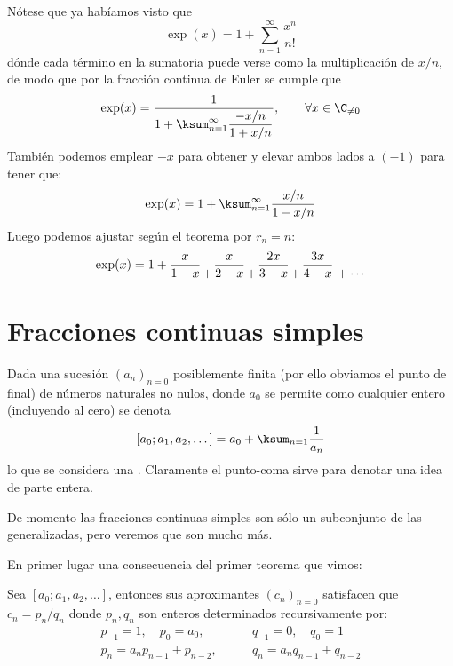 \documentclass[teoria-numeros.tex]{subfiles}
\begin{document}
\begin{ex}[ $\displaystyle \exp(x) = \frac{1}{1} {\atop +} \frac{-x/1}{1 + x/1} {\atop +} \frac{-x/2}{1 + x/2} {\atop +} \frac{-x/3}{1 + x/3} {\atop {}+\cdots} $ ]
	Nótese que ya habíamos visto que
	$$ \exp(x) = 1 + \sum_{n=1}^\infty \frac{x^n}{n!} $$
	dónde cada término en la sumatoria puede verse como la multiplicación de $x/n$, de modo que por la fracción continua de Euler se cumple que
	$$ \exp(x) = \frac{1}{ \displaystyle 1 + \ksum_{n=1}^\infty \frac{-x/n}{1 + x/n} }, \qquad \forall x\in\C_{\ne 0} $$
	También podemos emplear $-x$ para obtener y elevar ambos lados a $(-1)$ para tener que:
	$$ \exp(x) = 1 + \ksum_{n=1}^\infty \frac{x/n}{1 - x/n} $$
	Luego podemos ajustar según el teorema por $r_n = n$:
	$$ \exp(x) = 1 + \frac{x}{1 - x} {\atop +} \frac{x}{2 - x} {\atop +} \frac{2x}{3 - x} {\atop +} \frac{3x}{4 - x} {\atop {}+\cdots} $$
\end{ex}

\section{Fracciones continuas simples}
\begin{mydefi}
	Dada una sucesión $(a_n)_{n=0}$ posiblemente finita (por ello obviamos el punto de final) de números naturales no nulos, donde $a_0$ se permite como
	cualquier entero (incluyendo al cero) se denota
	$$ [a_0; a_1, a_2, \dots] = a_0 + \ksum_{n=1} \frac{1}{a_n} $$
	lo que se considera una .
	Claramente el punto-coma sirve para denotar una idea de parte entera.
\end{mydefi}
De momento las fracciones continuas simples son sólo un subconjunto de las generalizadas, pero veremos que son mucho más.

En primer lugar una consecuencia del primer teorema que vimos:
\begin{prop}
	Sea $[a_0; a_1, a_2, \dots]$, entonces sus aproximantes $(c_n)_{n=0}$ satisfacen que $c_n = p_n/q_n$ donde $p_n,q_n$ son enteros determinados
	recursivamente por:
	\begin{align*}
		p_{-1} = 1, \quad p_0 = a_0, &\qquad q_{-1} = 0, \quad q_0 = 1 \\
		p_n = a_np_{n-1} + p_{n-2}, &\qquad q_n = a_nq_{n-1} + q_{n-2}
	\end{align*}
\end{prop}
\end{document}
